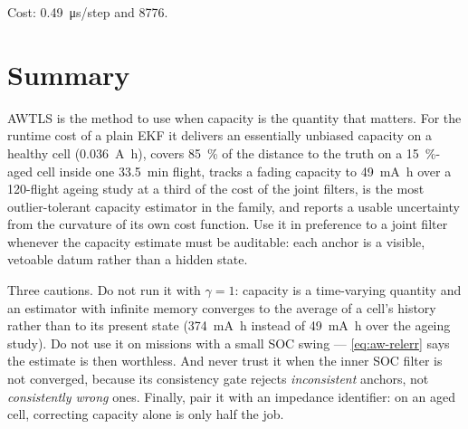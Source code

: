 Cost: \SI{0.49}{\micro\second}/step and \SI{8776}{\byte}.

\section{Summary}
AWTLS is the method to use when capacity is the quantity that matters.  For the runtime cost of a
plain EKF it delivers an essentially unbiased capacity on a healthy cell
(\SI{+0.036}{\ampere\hour}), covers \SI{85}{\percent} of the distance to the truth on a
\SI{15}{\percent}-aged cell inside one \SI{33.5}{\minute} flight, tracks a fading capacity to
\SI{49}{\milli\ampere\hour} over a 120-flight ageing study at a third of the cost of the joint
filters, is the most outlier-tolerant capacity estimator in the family, and reports a usable
uncertainty from the curvature of its own cost function.  Use it in preference to a joint filter
whenever the capacity estimate must be auditable: each anchor is a visible, vetoable datum rather
than a hidden state.

Three cautions.  Do not run it with $\gamma=1$: capacity is a time-varying quantity and an estimator
with infinite memory converges to the average of a cell's history rather than to its present state
(\SI{374}{\milli\ampere\hour} instead of \SI{49}{\milli\ampere\hour} over the ageing study).  Do not
use it on missions with a small SOC swing --- \eqref{eq:aw-relerr} says the estimate is then
worthless.  And never trust it when the inner SOC filter is not converged, because its consistency
gate rejects \emph{inconsistent} anchors, not \emph{consistently wrong} ones.  Finally, pair it with
an impedance identifier: on an aged cell, correcting capacity alone is only half the job.
